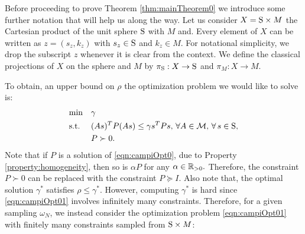

Before proceeding to prove Theorem \ref{thm:mainTheorem0} we introduce some further notation that will help us along the way. Let us consider $X = \text{S} \times M$ the Cartesian product of the unit sphere $\text{S}$ with $M$ and. Every element of $X$ can be written as $z = (s_z, k_z)$ with $s_z \in \text{S}$ and $k_z \in M$. For notational simplicity, we drop the subscript $z$ whenever it is clear from the context. We define the classical projections of $X$ on the sphere and $M$ by $\pi_{\text{S}}: X \to \text{S}$ and $\pi_M: X \to M$.

To obtain, an upper bound on $\rho$ the optimization problem we would like to solve is:
\begin{equation}\label{eqn:campiOpt0}
\begin{aligned}
& \text{min} & & \gamma \\
& \text{s.t.} 
&  & (As)^TP(As) \leq \gamma s^TPs,\,\forall A \in \mathcal{M}, \,\forall\, s \in \text{S},\\
& && P \succ 0. \\
\end{aligned}
\end{equation}
Note that if $P$ is a solution of \eqref{eqn:campiOpt0}, due to Property \ref{property:homogeneity}, then so is $\alpha P$ for any $\alpha \in \mathbb{R}_{> 0}.$ Therefore, the constraint $P \succ 0$ can be replaced with the constraint $P \succeq I$. Also note that, the optimal solution $\gamma^*$ satisfies $\rho \leq \gamma^*$. However, computing $\gamma^*$ is hard since \eqref{eqn:campiOpt01} involves infinitely many constraints. Therefore, for a given sampling $\omega_N$, we instead consider the optimization problem \eqref{eqn:campiOpt01} with finitely many constraints sampled from $\text{S} \times M$: 

